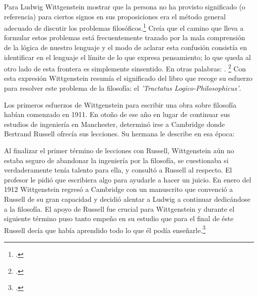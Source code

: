 Para Ludwig Wittgenstein mostrar que la
persona no ha provisto significado (o referencia) para ciertos signos en sus
proposiciones era el método general adecuado de discutir los problemas
filosóficos.\footcite[cf. p. 151]{IWT} Creía que el camino que lleva a formular
estos problemas está frecuentemente trazado por la mala comprensión de la lógica
de nuestro lenguaje y el modo de aclarar esta confusión consistía en identificar
en el lenguaje el límite de lo que expresa pensamiento; lo que queda al otro
lado de esta frontera es simplemente sinsentido. En otras palabras:
. 
\footcite[prefacio]{tractatus}
Con esta expresión  Wittgenstein resumía el significado del libro que recoge su
esfuerzo para resolver este problema de la filosofía: el \emph{'Tractatus
    Logico-Philosophicus'}. 

Los primeros esfuerzos de Wittgenstein para escribir una obra sobre filosofía
habían comenzado en 1911. En otoño de ese año en lugar de continuar sus estudios
de ingeniería en Manchester, determinó irse a Cambridge donde Bertrand Russell
ofrecía sus lecciones. Su hermana le describe en esa época:  

Al finalizar el primer término de lecciones con Russell, Wittgenstein aún no
estaba seguro de abandonar la ingeniería por la filosofía, se cuestionaba si
verdaderamente tenía talento para ella, y consultó a Russell al respecto. El
profesor le pidió que escribiera algo para ayudarle a hacer un juicio. En enero
del 1912 Wittgenstein regresó a Cambridge con un manuscrito que convenció a
Russell de su gran capacidad y decidió alentar a Ludwig a continuar
dedicándose a la filosofía. El apoyo de Russell fue crucial para Wittgenstein y
durante el siguiente término puso tanto empeño en su estudio que para el final
de éste Russell decía que había aprendido todo lo que él podía
enseñarle.\footcite[cap. 3 loc 865]{monk} 

